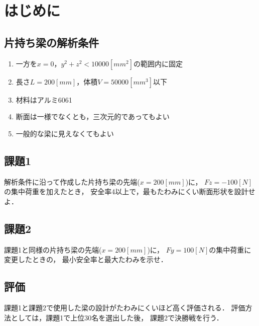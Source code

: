 \section{はじめに}
  \subsection{片持ち梁の解析条件}
    \begin{enumerate}
      \item 一方を$x=0$，$y^2+z^2<10000[mm^2]$の範囲内に固定
      \item 長さ$L=200[mm]$，体積$V=50000[mm^3]$以下
      \item 材料はアルミ6061
      \item 断面は一様でなくとも，三次元的であってもよい
      \item 一般的な梁に見えなくてもよい
    \end{enumerate}
  \subsection{課題1}
    解析条件に沿って作成した片持ち梁の先端($x=200[mm]$)に，
    $Fz=-100[N]$の集中荷重を加えたとき，
    安全率4以上で，最もたわみにくい断面形状を設計せよ．
  \subsection{課題2}
    課題1と同様の片持ち梁の先端($x=200[mm]$)に，
    $Fy=100[N]$の集中荷重に変更したときの，
    最小安全率と最大たわみを示せ．
  \subsection{評価}
    課題1と課題2で使用した梁の設計がたわみにくいほど高く評価される．
    評価方法としては，課題1で上位30名を選出した後，
    課題2で決勝戦を行う．
